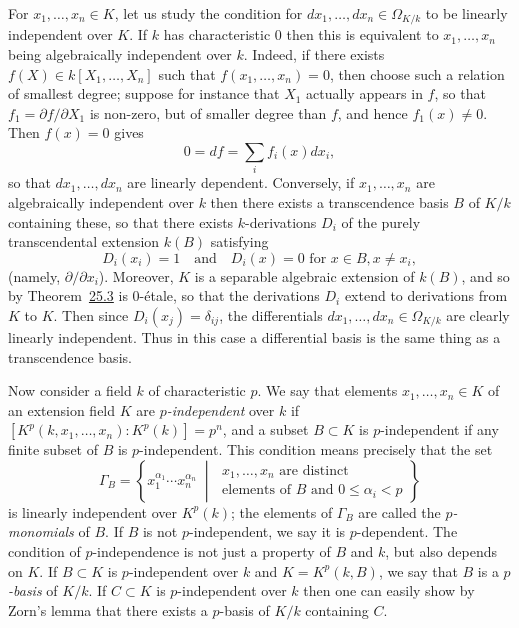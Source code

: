 For $x_1, \ldots, x_n \in K$, let us study the condition for $dx_1, \ldots, dx_n \in \Omega_{K/k}$ to
be linearly independent over $K$. If $k$ has characteristic $0$ then this is equivalent
to $x_1, \ldots, x_n$ being algebraically independent over $k$. Indeed, if there exists
$f(X) \in k[X_1, \ldots, X_n]$ such that $f(x_1, \ldots, x_n) = 0$, then choose such a
relation of smallest degree; suppose for instance that $X_1$ actually appears in $f$,
so that $f_1 = \partial f/\partial X_1$ is non-zero, but of smaller degree than $f$, and hence
$f_1(x) \ne 0$. Then $f(x) = 0$ gives
\[
  0 = df = \sum_i f_i(x)dx_i,
\]
so that $dx_1, \ldots, dx_n$ are linearly dependent. Conversely, if $x_1, \ldots, x_n$ are
algebraically independent over $k$ then there exists a transcendence basis $B$ of
$K/k$ containing these, so that there exists $k$-derivations $D_i$ of the purely
transcendental extension $k(B)$ satisfying
\[
  D_i(x_i) = 1 \quad \text{and} \quad D_i(x) = 0 \text{ for } x \in B, x \neq x_i,
\]
(namely, $\partial/\partial x_i$). Moreover, $K$ is a separable algebraic extension of $k(B)$, and
so by Theorem~\hyperref[thm:25.3]{25.3} is 0-\'etale, so that the derivations $D_i$ extend to
derivations from $K$ to $K$. Then since $D_i(x_j) = \delta_{ij}$, the differentials
$dx_1, \ldots, dx_n \in \Omega_{K/k}$ are clearly linearly independent. Thus in this case a
differential basis is the same thing as a transcendence basis.

Now consider a field $k$ of characteristic $p$. We say that elements
$x_1, \ldots, x_n \in K$ of an extension field $K$ are \emph{$p$-independent} over $k$ if
$[K^p(k, x_1, \ldots, x_n) : K^p(k)] = p^n$, and a subset $B \subset K$ is $p$-independent if any
finite subset of $B$ is $p$-independent. This condition means precisely that the
set
\[
  \Gamma_B = \left\{ x_1^{\alpha_1} \cdots x_n^{\alpha_n} \;\middle|\;
      \begin{array}{l}
        x_1, \ldots, x_n \text{ are distinct} \\
        \text{elements of } B \text{ and } 0 \le \alpha_i < p
      \end{array} \right\}
\]
is linearly independent over $K^p(k)$; the elements of $\Gamma_B$ are called the
\emph{$p$-monomials} of $B$. If $B$ is not $p$-independent, we say it is $p$-dependent.
The condition of $p$-independence is not just a property of $B$ and $k$, but also
depends on $K$. If $B \subset K$ is $p$-independent over $k$ and $K = K^p(k, B)$, we say
that $B$ is a \emph{$p$-basis} of $K/k$. If $C \subset K$ is $p$-independent over $k$ then one
can easily show by Zorn's lemma that there exists a $p$-basis of $K/k$ containing
$C$.

